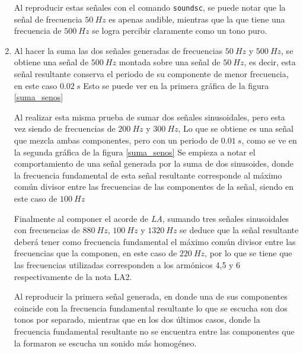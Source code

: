 \begin{enumerate}
    Al reproducir estas señales con el comando \texttt{soundsc}, se puede notar que la señal de frecuencia $50~Hz$  es apenas audible, mientras que la que tiene una frecuencia de $500~Hz$  se logra percibir claramente como un tono puro.
    
    
    \item   Al hacer la suma las dos señales generadas de frecuencias $50~Hz$ y $500~Hz$, se obtiene una señal de $500~Hz$ montada sobre una señal de $50~Hz$, es decir, esta señal resultante conserva el periodo de su componente de menor frecuencia, en este caso $0.02~s$ Esto se puede ver en la primera gráfica de la figura \ref{suma_senos}
    
    
    Al realizar esta misma prueba de sumar dos señales sinusoidales, pero esta vez siendo de frecuencias de $200~Hz$ y  $300~Hz$, Lo que se obtiene es una señal que mezcla ambas componentes,  pero con un periodo de $0.01~s$, como se ve en la segunda gráfica de la figura \ref{suma_senos} Se empieza a notar el comportamiento de una señal generada por la suma de dos sinusoides, donde la frecuencia fundamental de esta señal resultante corresponde al máximo común divisor entre las frecuencias de las componentes de la señal, siendo en este caso de $100~Hz$
    
    Finalmente al componer el acorde de \textit{LA}, sumando tres señales sinusoidales con frecuencias de $880~Hz$, $100~Hz$ y $1320~Hz$ se deduce que la señal resultante deberá tener como frecuencia fundamental el máximo común divisor entre las frecuencias que la componen, en este caso de $220~Hz$, por lo que se tiene que las  frecuencias utilizadas corresponden a los armónicos 4,5 y 6 respectivamente de la nota LA2.
    
    
    Al reproducir la primera señal generada, en donde una de sus componentes coincide con la frecuencia fundamental resultante lo que se escucha son dos tonos por separado, mientras que en los dos últimos casos, donde la frecuencia fundamental resultante no se encuentra entre las componentes que la formaron se escucha un sonido más homogéneo.
    

\end{enumerate}
